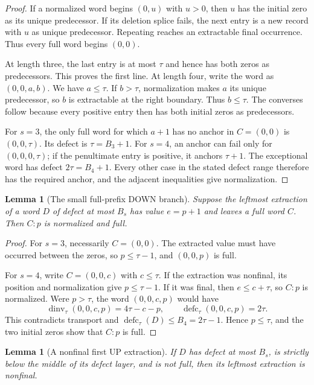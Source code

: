 \documentclass[11pt]{article}
\newtheorem{lemma}[theorem]{Lemma}
\theoremstyle{definition}
\theoremstyle{remark}
\newcommand{\dinv}{\operatorname{dinv}}
\newcommand{\defc}{\operatorname{defc}}
\begin{document}
\begin{proof}
If a normalized word begins $(0,u)$ with $u>0$, then $u$ has the initial
zero as its unique predecessor.  If its deletion splice fails, the next
entry is a new record with $u$ as unique predecessor.  Repeating reaches an
extractable final occurrence.  Thus every full word begins $(0,0)$.

At length three, the last entry is at most $\tau$ and hence has both zeros
as predecessors.  This proves the first line.  At length four, write the
word as $(0,0,a,b)$.  We have $a\le\tau$.  If $b>\tau$, normalization makes
$a$ its unique predecessor, so $b$ is extractable at the right boundary.
Thus $b\le\tau$.  The converses follow because every positive entry then
has both initial zeros as predecessors.

For $s=3$, the only full word for which $a+1$ has no anchor in $C=(0,0)$
is $(0,0,\tau)$.  Its defect is $\tau=B_3+1$.  For $s=4$, an anchor can
fail only for $(0,0,0,\tau)$; if the penultimate entry is positive, it
anchors $\tau+1$.  The exceptional word has defect $2\tau=B_4+1$.
Every other case in the stated defect range therefore has the required
anchor, and the adjacent inequalities give normalization.
\end{proof}

\begin{lemma}[The small full-prefix DOWN branch]
\label{lem:full-prefix}
Suppose the leftmost extraction of a word $D$ of defect at most $B_s$ has
value $e=p+1$ and leaves a full word $C$.  Then $C:p$ is normalized and
full.
\end{lemma}

\begin{proof}
For $s=3$, necessarily $C=(0,0)$.  The extracted value must have occurred
between the zeros, so $p\le\tau-1$, and $(0,0,p)$ is full.

For $s=4$, write $C=(0,0,c)$ with $c\le\tau$.  If the extraction was
nonfinal, its position and normalization give $p\le\tau-1$.  If it was
final, then $e\le c+\tau$, so $C:p$ is normalized.  Were $p>\tau$, the
word $(0,0,c,p)$ would have
\[
 \dinv_\tau(0,0,c,p)=4\tau-c-p,\qquad
 \defc_\tau(0,0,c,p)=2\tau.
\]
This contradicts transport and $\defc_\tau(D)\le B_4=2\tau-1$.  Hence
$p\le\tau$, and the two initial zeros show that $C:p$ is full.
\end{proof}

\begin{lemma}[A nonfinal first UP extraction]
\label{lem:up-nonfinal}
If $D$ has defect at most $B_s$, is strictly below the middle of its defect
layer, and is not full, then its leftmost extraction is nonfinal.
\end{lemma}
\end{document}
